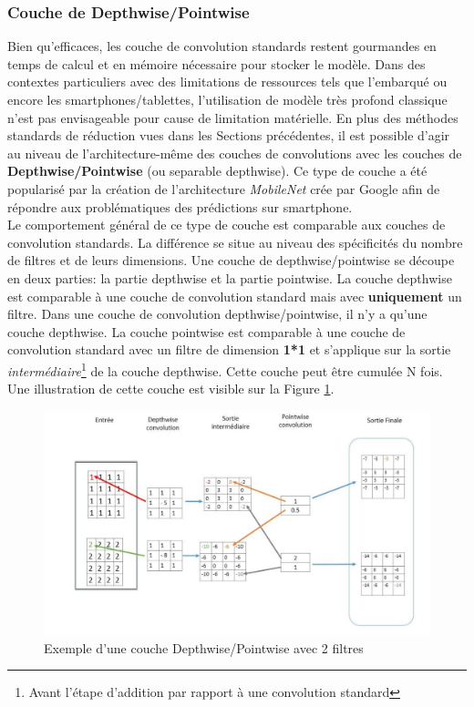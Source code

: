 \subsubsection{Couche de Depthwise/Pointwise}
\label{depthwiseconv}
Bien qu'efficaces, les couche de convolution standards restent gourmandes en temps de calcul et en mémoire nécessaire pour stocker le modèle. Dans des contextes particuliers avec des limitations de ressources tels que l'embarqué ou encore les smartphones/tablettes, l'utilisation de modèle très profond classique n'est pas envisageable pour cause de limitation matérielle. En plus des méthodes standards de réduction vues dans les Sections précédentes, il est possible d'agir au niveau de l'architecture-même des couches de convolutions avec les couches de \textbf{Depthwise/Pointwise} (ou separable depthwise). Ce type de couche a été popularisé par la création de l'architecture \textit{MobileNet}\cite{mobilenet} crée par Google afin de répondre aux problématiques des prédictions sur smartphone. \\

\noindent Le comportement général de ce type de couche est comparable aux couches de convolution standards. La différence se situe au niveau des spécificités du nombre de filtres et de leurs dimensions. Une couche de depthwise/pointwise se découpe en deux parties: la partie depthwise et la partie pointwise. La couche depthwise est comparable à une couche de convolution standard mais avec \textbf{uniquement} un filtre. Dans une couche de convolution depthwise/pointwise, il n'y a qu'une couche depthwise. La couche pointwise est comparable à une couche de convolution standard avec un filtre de dimension \textbf{1*1} et s'applique sur la sortie \textit{intermédiaire}\footnote{Avant l'étape d'addition par rapport à une convolution standard} de la couche depthwise. Cette couche peut être cumulée N fois. Une illustration de cette couche est visible sur la Figure \ref{depthwise_fig}.\\

\begin{figure}
    \centering
    \includegraphics[scale=0.3]{./tex/convolution-network/cnn/depthwise.png}
    \caption{Exemple d'une couche Depthwise/Pointwise avec 2 filtres}
    \label{depthwise_fig}
\end{figure}

